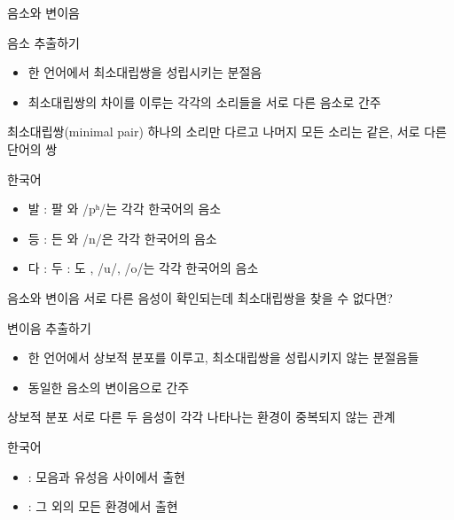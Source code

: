 \documentclass[11pt, aspectratio=169]{beamer}
\newcommand{\textds}[1]{{\ipafont #1}}
\begin{document}
\begin{frame}[t]{음소와 변이음}
    \begin{block}{음소 추출하기}
        \begin{itemize}
            \item 한 언어에서 최소대립쌍을 성립시키는 분절음
            \item 최소대립쌍의 차이를 이루는 각각의 소리들을 서로 다른 음소로 간주
        \end{itemize}
    \end{block}
    \begin{block}{최소대립쌍(minimal pair)}
        하나의 소리만 다르고 나머지 모든 소리는 같은, 서로 다른 단어의 쌍
    \end{block}
    한국어
    \begin{itemize}
        \item 발 : 팔 \rightarrow \textds{/p/}와 \textds{/pʰ/}는 각각 한국어의 음소
        \item 등 : 든 \rightarrow \textds{/ŋ/}와 \textds{/n/}은 각각 한국어의 음소
        \item 다 : 두 : 도 \rightarrow \textds{/a/}, \textds{/u/}, \textds{/o/}는 각각 한국어의 음소
    \end{itemize}
\end{frame}

\begin{frame}[t]{음소와 변이음}
    서로 다른 음성이 확인되는데 최소대립쌍을 찾을 수 없다면?
    \begin{block}{변이음 추출하기}
        \begin{itemize}
            \item 한 언어에서 상보적 분포를 이루고, 최소대립쌍을 성립시키지 않는 분절음들
            \item 동일한 음소의 변이음으로 간주
        \end{itemize}
    \end{block}
    \begin{block}{상보적 분포}
        서로 다른 두 음성이 각각 나타나는 환경이 중복되지 않는 관계
    \end{block}
    한국어
    \begin{itemize}
        \item \textds{[b]}: 모음과 유성음 사이에서 출현
        \item \textds{[p]}: 그 외의 모든 환경에서 출현
    \end{itemize}
\end{frame}
\end{document}
